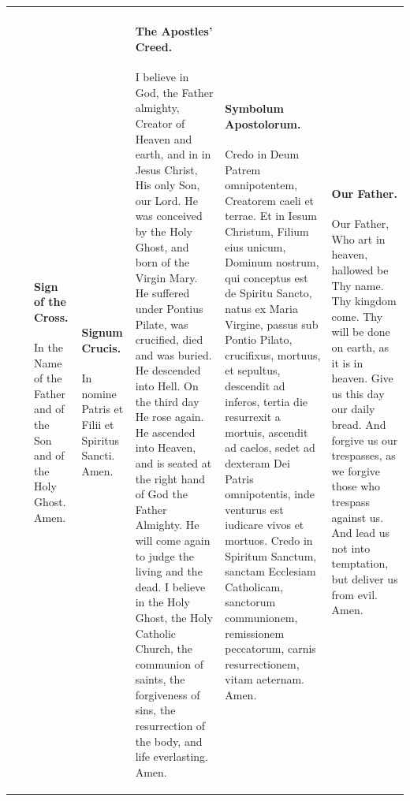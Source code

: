 \documentclass{article}
\begin{document}
\begin{tabularx}{\textwidth}{ |X|X| }
\hline
{} &  &
\hline
\vspace{-5pt}
\paragraph{Sign of the Cross.} In the Name of the Father and of the Son and of the Holy Ghost. Amen.
&
\vspace{-5pt}
\paragraph{Signum Crucis.} In nomine Patris et Filii et Spiritus Sancti. Amen.
&
\paragraph{The Apostles' Creed.} I believe in God, the Father almighty, Creator of Heaven and earth, and in in Jesus Christ, His only Son, our Lord. He was conceived by the Holy Ghost, and born of the Virgin Mary. He suffered under Pontius Pilate, was crucified, died and was buried. He descended into Hell. On the third day He rose again. He ascended into Heaven, and is seated at the right hand of God the Father Almighty. He will come again to judge the living and the dead. I believe in the Holy Ghost, the Holy Catholic Church, the communion of saints, the forgiveness of sins, the resurrection of the body, and life everlasting. Amen.
&
\paragraph{Symbolum Apostolorum.} Credo in Deum Patrem omnipotentem, Creatorem caeli et terrae. Et in Iesum Christum, Filium eius unicum, Dominum nostrum, qui conceptus est de Spiritu Sancto, natus ex Maria Virgine, passus sub Pontio Pilato, crucifixus, mortuus, et sepultus, descendit ad inferos, tertia die resurrexit a mortuis, ascendit ad caelos, sedet ad dexteram Dei Patris omnipotentis, inde venturus est iudicare vivos et mortuos. Credo in Spiritum Sanctum, sanctam Ecclesiam Catholicam, sanctorum communionem, remissionem peccatorum, carnis resurrectionem, vitam aeternam. Amen.
&
\paragraph{Our Father.} Our Father, Who art in heaven, hallowed be Thy name.
Thy kingdom come.  Thy will be done on earth, as it is in heaven.
Give us this day our daily bread.  And forgive us our trespasses,
as we forgive those who trespass against us.  And lead us not
into temptation, but deliver us from evil.  Amen.
&

\end{tabularx}
\end{document}
